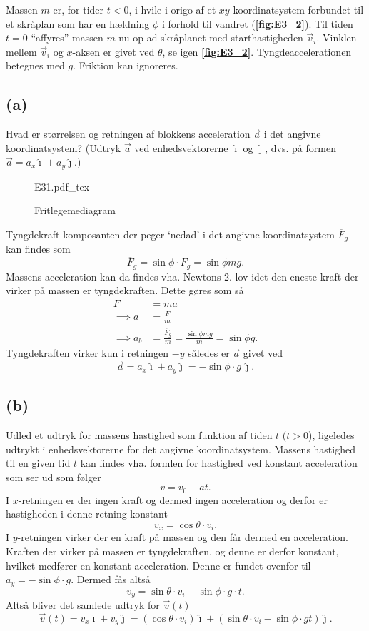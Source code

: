 \documentclass[12pt]{article}
\newcommand{\incfig}[2][1]{%
  \def\svgwidth{#1\columnwidth}
  {#2.pdf_tex}
}
\theoremstyle{definition}
\begin{document}
Massen $m$ er, for tider $t < 0$, i hvile i origo af et $xy$-koordinatsystem forbundet til et skråplan som har en hældning $\phi$ i forhold til vandret (\textbf{\autoref{fig:E3_2}}). Til tiden $t = 0$ ``affyres'' massen $m$ nu op ad skråplanet med starthastigheden $\Vec{v}_i$. Vinklen mellem $\Vec{v}_i$ og $x$-aksen er givet ved $\theta$, se igen \textbf{\autoref{fig:E3_2}}. Tyngdeaccelerationen betegnes med $g$. Friktion kan ignoreres.


\subsection*{(a)}
Hvad er størrelsen og retningen af blokkens acceleration $\Vec{a}$ i det angivne koordinatsystem? (Udtryk $\Vec{a}$ ved enhedsvektorerne $\hat{\imath}$ og $\hat{\jmath}$, dvs. på formen $\Vec{a} = a_x \hat{\imath} + a_y \hat{\jmath}$.)
\bigbreak
\begin{figure}[ht]
  \centering
  \incfig[0.5]{E31}
  \caption{Fritlegemediagram}
  \label{fig:E31}
\end{figure}

Tyngdekraft-komposanten der peger `nedad' i det angivne koordinatsystem $\overline{F}_g$ kan findes som
\[ 
\overline{F}_g = \sin \phi \cdot F_g = \sin \phi mg
.\]
Massens acceleration kan da findes vha. Newtons 2. lov idet den eneste kraft der virker på massen er tyngdekraften. Dette gøres som så
\begin{align*}
  F &= ma \\
  \implies a &= \frac{F}{m} \\
  \implies a_b &= \frac{\overline{F}_g}{m} = \frac{\sin \phi mg}{m} = \sin\phi g
.\end{align*}
Tyngdekraften virker kun i retningen $-y$ således er $\Vec{a}$ givet ved
\[ 
\Vec{a} = a_x \hat{\imath} + a_y \hat{\jmath} = - \sin \phi \cdot  g \, \hat{\jmath}
.\]


\subsection*{(b)}
Udled et udtryk for massens hastighed som funktion af tiden $t$ ($t > 0$), ligeledes udtrykt i enhedsvektorerne for det angivne koordinatsystem.
\bigbreak
Massens hastighed til en given tid $t$ kan findes vha. formlen for hastighed ved konstant acceleration som ser ud som følger
\[ 
v = v_{0} + at
.\]
I $x$-retningen er der ingen kraft og dermed ingen acceleration og derfor er hastigheden i denne retning konstant
\[ 
v_x = \cos \theta \cdot v_i
.\]
I $y$-retningen virker der en kraft på massen og den får dermed en acceleration. Kraften der virker på massen er tyngdekraften, og denne er derfor konstant, hvilket medfører en konstant acceleration. Denne er fundet ovenfor til $a_y = - \sin \phi \cdot g$. Dermed fås altså
\[ 
v_y = \sin \theta \cdot v_i - \sin \phi \cdot g \cdot t
.\]
Altså bliver det samlede udtryk for $\Vec{v}(t)$
\[ 
\Vec{v}(t) = v_x \hat{\imath} + v_y \hat{\jmath} = \left( \cos \theta \cdot v_i \right) \hat{\imath} + \left( \sin \theta \cdot v_i - \sin\phi \cdot g t \right) \hat{\jmath}
.\]
\end{document}
